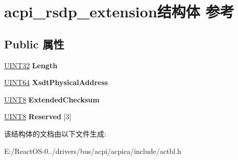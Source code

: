 \hypertarget{structacpi__rsdp__extension}{}\section{acpi\+\_\+rsdp\+\_\+extension结构体 参考}
\label{structacpi__rsdp__extension}
\subsection*{Public 属性}
\begin{DoxyCompactItemize}
\item 
\mbox{\label{structacpi__rsdp__extension_a40594a9c9b8a523fdb5f14457fd5ab8c}} 
\hyperlink{_processor_bind_8h_ae1e6edbbc26d6fbc71a90190d0266018}{U\+I\+N\+T32} {\bfseries Length}
\item 
\mbox{\label{structacpi__rsdp__extension_a2bebc52aa4be7a3b87841203693f3c5c}} 
\hyperlink{_processor_bind_8h_a57be03562867144161c1bfee95ca8f7c}{U\+I\+N\+T64} {\bfseries Xsdt\+Physical\+Address}
\item 
\mbox{\label{structacpi__rsdp__extension_a3c62d5a0851a61f175946e29229e3318}} 
\hyperlink{_processor_bind_8h_ab27e9918b538ce9d8ca692479b375b6a}{U\+I\+N\+T8} {\bfseries Extended\+Checksum}
\item 
\mbox{\label{structacpi__rsdp__extension_aec6bdfaf0c3e74223056b9101c91938f}} 
\hyperlink{_processor_bind_8h_ab27e9918b538ce9d8ca692479b375b6a}{U\+I\+N\+T8} {\bfseries Reserved} \mbox{[}3\mbox{]}
\end{DoxyCompactItemize}


该结构体的文档由以下文件生成\+:\begin{DoxyCompactItemize}
\item 
E\+:/\+React\+O\+S-\/0../drivers/bus/acpi/acpica/include/actbl.\+h\end{DoxyCompactItemize}
